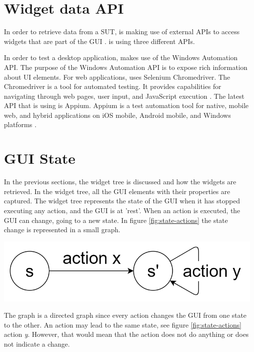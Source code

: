 \section{Widget data API}

In order to retrieve data from a SUT, \testar is making use of external APIs to access widgets that are part of the GUI \cite{thesisMulders}. \testar is using three different APIs.

In order to test a desktop application, \testar makes use of the Windows Automation API. The purpose of the Windows Automation API is to expose rich information about UI elements\cite{win-api-info}. For web applications, \testar uses Selenium Chromedriver. The Chromedriver is a tool for automated testing. It provides capabilities for navigating through web pages, user input, and JavaScript execution \cite{chrome-driver-info}. The latest API that \testar is using is Appium. Appium is a test automation tool for native, mobile web, and hybrid applications on iOS mobile, Android mobile, and Windows platforms \cite{appium-info}.

\section{GUI State} \label{gui-state}
In the previous sections, the widget tree is discussed and how the widgets are retrieved. In the widget tree, all the GUI elements with their properties are captured. The widget tree represents the state of the GUI when it has stopped executing any action, and the GUI is at 'rest'. When an action is executed, the GUI can change, going to a new state. In figure \ref{fig:state-actions} the state change is represented in a small graph. 

\bigskip
\begingroup
\captionsetup{type=figure}
\includegraphics[scale=0.5]{images/state-action.png}
\label{fig:state-actions}
\endgroup

The graph is a directed graph since every action changes the GUI from one state to the other. An action may lead to the same state, see figure \ref{fig:state-actions} action \textit{y}. However, that would mean that the action does not do anything or \testar does not indicate a change.

